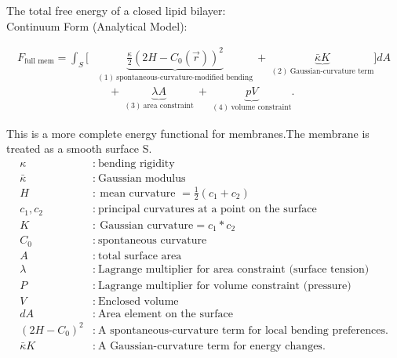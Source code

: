 \documentclass[12pt]{article}
\begin{document}
\begin{flushleft}
The total free energy of a closed lipid bilayer:\\
Continuum Form (Analytical Model):
\vspace{-1em}


\begin{align}
F_\text{full mem} = \int_S \Bigg[
&\underbrace{\frac{\kappa}{2} \left(2H - C_0(\vec{r}) \right)^2}_{(1)\ \text{spontaneous-curvature-modified bending}} 
\ + \ 
\underbrace{\bar{\kappa} K}_{(2)\ \text{Gaussian-curvature term}} 
\Bigg] dA \nonumber \\
&\quad + \ 
\underbrace{\lambda A}_{(3)\ \text{area constraint}} 
\ + \ 
\underbrace{p V}_{(4)\ \text{volume constraint}}.
\end{align}




\noindent This is a more complete energy functional for membranes.The membrane is treated as a smooth surface S.
\vspace{-2em} 
\begin{align*}
\kappa &:\ \text{bending rigidity} \\
\bar{\kappa} &:\ \text{Gaussian modulus} \\
H &:\ \text{mean curvature $= \frac{1}{2} (c_1 + c_2)$} \\
c_1,c_2 &:\ \text{principal curvatures at a point on the surface}\\
K &:\ \text{Gaussian curvature}=c_1*c_2 \\
C_0 &:\ \text{spontaneous curvature} \\
A &:\ \text{total surface area} \\
\lambda &:\ \text{Lagrange multiplier for area constraint (surface tension)} \\
P &:\ \text{Lagrange multiplier for volume constraint (pressure)}\\
V &:\ \text{Enclosed volume}\\
dA &:\ \text{Area element on the surface}\\
(2H - C_0)^2 &:\ \text{A spontaneous-curvature term for local bending preferences.}\\
\bar{\kappa} K &:\ \text{A Gaussian-curvature term for energy changes.}
\end{align*}




\vspace{-1em}


\end{flushleft}
\end{document}
